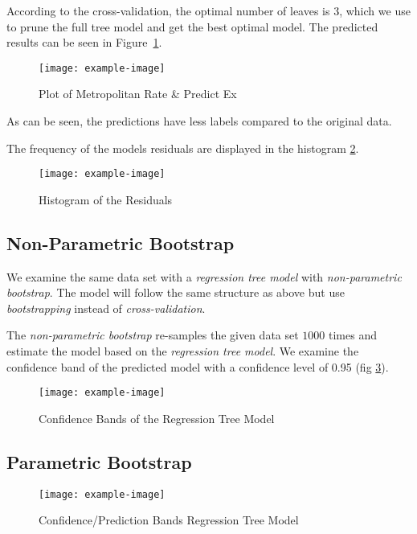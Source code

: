 \documentclass[a4paper, twocolumn]{article}
\begin{document}
    According to the cross-validation, the optimal number of leaves is 3, which we use to prune the full tree model and get the best optimal model. The predicted results can be seen in Figure~\ref{fig:predicted}.

    \begin{figure}[h!]
        \centering
        \caption{Plot of Metropolitan Rate \& Predict Ex}
        \label{fig:predicted}
        \texttt{[image: example-image]}
    \end{figure}

    As can be seen, the predictions have less labels compared to the original data.

    The frequency of the models residuals are displayed in the histogram \ref{fig:residuals}.

    \begin{figure}[h!]
        \centering
        \caption{Histogram of the Residuals}
        \label{fig:residuals}
        \texttt{[image: example-image]}
    \end{figure}

    \subsection*{Non-Parametric Bootstrap}

    We examine the same data set with a \emph{regression tree model} with \emph{non-parametric bootstrap}. The model will follow the same structure as above but use \emph{bootstrapping} instead of \emph{cross-validation}.

    The \emph{non-parametric bootstrap} re-samples the given data set $1000$ times and estimate the model based on the \emph{regression tree model}. We examine the confidence band of the predicted model with a confidence level of 0.95 (fig \ref{fig:confidence_bands}).

        \begin{figure}[h!]
          \centering
          \caption{Confidence Bands of the Regression Tree Model}
          \label{fig:confidence_bands}
          \texttt{[image: example-image]}
        \end{figure}

    \subsection*{Parametric Bootstrap}

        \begin{figure}[h!]
          \centering
          \caption{Confidence/Prediction Bands Regression Tree Model}
          \label{fig:confpred_bands}
          \texttt{[image: example-image]}
        \end{figure}
\end{document}
